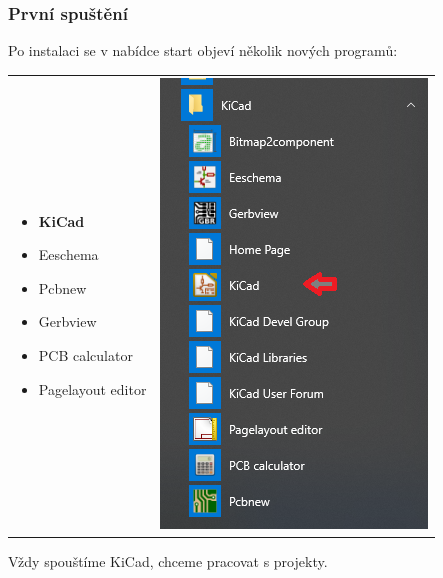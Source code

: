 \documentclass{beamer}
\begin{document}
	\begin{frame}
    \frametitle{První spuštění}
    \small
    	Po instalaci se v nabídce start objeví několik nových programů:
      \begin{tabular}{ m{6cm} m{2cm} }
         \begin{itemize}
           \item \textbf{KiCad}
           \item Eeschema
           \item Pcbnew
           \item Gerbview
           \item PCB calculator
           \item Pagelayout editor
         \end{itemize}
         & 
        \begin{minipage}{\textwidth}
          \includegraphics[scale=0.3]{obr/nabStart.png}
        \end{minipage}
      \end{tabular} 
   
  Vždy spouštíme KiCad, chceme pracovat s projekty.
	\end{frame}
\end{document}
